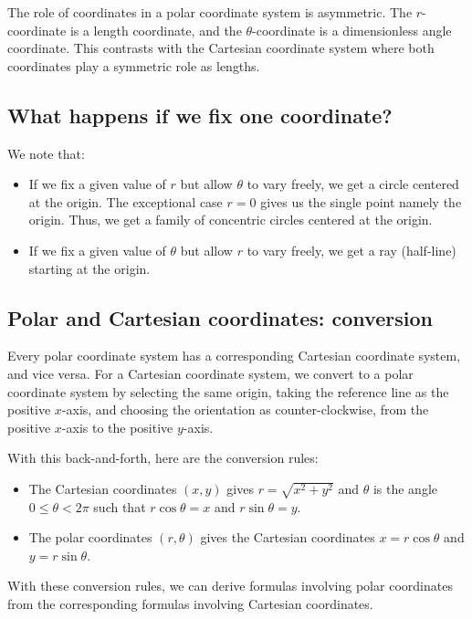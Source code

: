 \documentclass[10pt]{amsart}
\begin{document}
The role of coordinates in a polar coordinate system is
asymmetric. The $r$-coordinate is a length coordinate, and the
$\theta$-coordinate is a dimensionless angle coordinate. This
contrasts with the Cartesian coordinate system where both coordinates
play a symmetric role as lengths.

\subsection{What happens if we fix one coordinate?}

We note that:

\begin{itemize}
\item If we fix a given value of $r$ but allow $\theta$ to vary
  freely, we get a circle centered at the origin. The exceptional case
  $r = 0$ gives us the single point namely the origin. Thus, we get a
  family of concentric circles centered at the origin.
\item If we fix a given value of $\theta$ but allow $r$ to vary
  freely, we get a ray (half-line) starting at the origin.
\end{itemize}

\subsection{Polar and Cartesian coordinates: conversion}

Every polar coordinate system has a corresponding Cartesian coordinate
system, and vice versa. For a Cartesian coordinate system, we convert
to a polar coordinate system by selecting the same origin, taking the
reference line as the positive $x$-axis, and choosing the orientation
as counter-clockwise, from the positive $x$-axis to the positive
$y$-axis.

With this back-and-forth, here are the conversion rules:

\begin{itemize}
\item The Cartesian coordinates $(x,y)$ gives $r = \sqrt{x^2 + y^2}$
  and $\theta$ is the angle $0 \le \theta < 2\pi$ such that $r \cos
  \theta = x$ and $r \sin \theta = y$.
\item The polar coordinates $(r,\theta)$ gives the Cartesian
  coordinates $x = r\cos \theta$ and $y = r\sin \theta$.
\end{itemize}

With these conversion rules, we can derive formulas involving polar
coordinates from the corresponding formulas involving Cartesian
coordinates.
\end{document}
